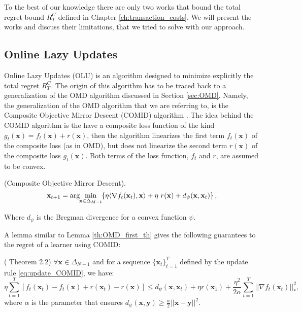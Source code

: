 To the best of our knowledge there are only two works that bound the total regret bound $R_T^C$ defined in Chapter \ref{ch:transaction_costs}. We will present the works and discuss their limitations, that we tried to solve with our approach.

\subsection{Online Lazy Updates}

Online Lazy Updates (OLU) \cite{das2013online} is an algorithm designed to minimize explicitly the total regret $R_T^C$. The origin of this algorithm has to be traced back to a generalization of the OMD algorithm discussed in Section \ref{sec:OMD}. Namely, the generalization of the OMD algorithm that we are referring to, is the Composite Objective Mirror Descent (COMID) algorithm \cite{duchi2010composite}. The idea behind the COMID algorithm is the have a composite loss function of the kind $g_t(\mathbf x)=f_t(\mathbf x) + r(\mathbf x)$, then the algorithm linearizes the first term $f_t(\mathbf x)$ of the composite loss (as in OMD), but does not linearize the second term $r(\mathbf x)$ of the composite loss $g_t(\mathbf x)$. Both terms of the loss function, $f_t$ and $r$, are assumed to be convex.

\begin{definition}(Composite Objective Mirror Descent).\label{def:COMID}
\begin{equation}\label{eq:update_COMID}
    \mathbf{x}_{t+1}=\arg \hspace{-0.1cm} \min\limits_{\mathbf{x} \in \Delta_{M-1}} \hspace{-0.1cm} \left\{ \eta \langle \nabla f_t(\mathbf{x}_t), \mathbf{x} \rangle + \eta \ r(\mathbf{x}) + d_\psi(\mathbf{x}, \mathbf{x}_t) \right\},
\end{equation}

Where $d_\psi$ is the Bregman divergence for a convex function $\psi$. 

\end{definition}

A lemma similar to Lemma \ref{th:OMD_first_th} gives the following guarantees to the regret of a learner using COMID:

\begin{lemma}(\cite{duchi2010composite} Theorem 2.2)
$\forall \mathbf x\in\Delta_{N-1}$ and for a sequence $\{\mathbf x_t\}_{t=1}^T$ defined by the update rule \eqref{eq:update_COMID}, we have:
\begin{equation}
\eta\sum\limits_{t=1}^T[f_t(\mathbf x_t)-f_t(\mathbf x)+r(\mathbf x_t)-r(\mathbf x)]\le d_\psi(\mathbf x,\mathbf x_t)+\eta r(\mathbf x_1)+\frac{\eta^2}{2\alpha}\sum\limits_{t=1}^T||\nabla f_t(\mathbf x_t)||_*^2,
\end{equation} 
where $\alpha$ is the parameter that ensures $d_\psi(\mathbf x,\mathbf y)\ge \frac{\alpha}{2}||\mathbf x-\mathbf y||^2$.
\end{lemma}

